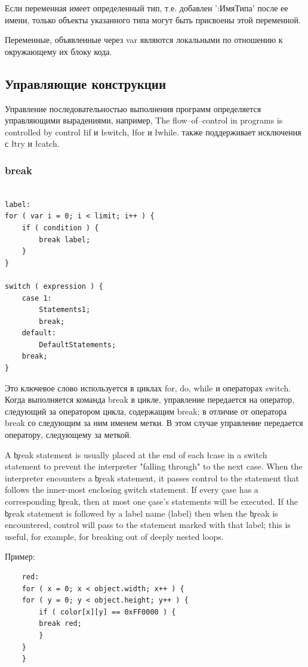 \documentclass[11pt,russian,a4paper]{article}
\begin{document}
Если переменная имеет определенный тип, т.е. добавлен
':ИмяТипа' после ее имени, только объекты указанного типа
могут быть присвоены этой переменной.

Переменные, объявленные через var являются локальными
по отношению к окружающему их блоку кода.

\subsection{Управляющие конструкции}

Управление последовательностью выполнения программ \AS
определяется управляющими вырадениями, например,
The flow--of--control in \QS programs is controlled by control
\l if и \l switch, \l for и \l while. \AS
также поддерживает исключения с \l try и \l catch.


\subsubsection{break}

\begin{verbatim}

label:
for ( var i = 0; i < limit; i++ ) {
    if ( condition ) {
        break label;
    }
}

switch ( expression ) {
    case 1:
        Statements1;
        break;
    default:
        DefaultStatements;
	break;
}
\end{verbatim}

Это ключевое слово используется в циклах for, do, while и
операторах switch. Когда выполняется команда break в цикле,
управление передается на оператор, следующий за оператором цикла,
содержащим break; в отличие от оператора
break со следующим за ним именем метки. В этом случае
управление передается оператору, следующему за меткой.

A \c break statement is usually placed at the end of each \l{case} in
a switch statement to prevent the interpreter "falling through" to the
next case. When the interpreter encounters a \c break statement, it
passes control to the statement that follows the inner-most enclosing
\c switch statement. If every \c case has a corresponding \c break,
then at most one \c case's statements will be executed. If the \c
break statement is followed by a label name (\e label) then when the
\c break is encountered, control will pass to the statement marked
with that label; this is useful, for example, for breaking out of
deeply nested loops.

Пример:
\begin{verbatim}
    red:
    for ( x = 0; x < object.width; x++ ) {
	for ( y = 0; y < object.height; y++ ) {
	    if ( color[x][y] == 0xFF0000 ) {
		break red;
	    }
	}
    }
\end{verbatim}
\end{document}
